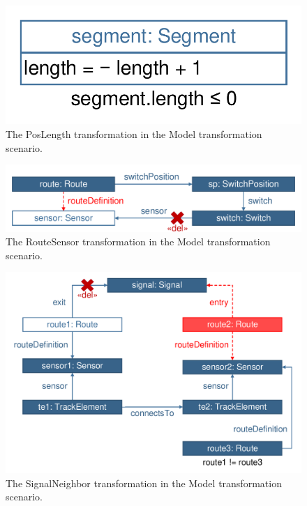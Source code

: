 \begin{figure}[htb]
	\centering
	\includegraphics[scale=0.4]{figures/trainbenchmark-transformation-xform-poslength}
	\caption{The \textsf{PosLength} transformation in the Model transformation scenario.}
	\label{fig:trainbenchmark-transformation-xform-poslength}
\end{figure}

\begin{figure}[htb]
	\centering
	\includegraphics[scale=0.4]{figures/trainbenchmark-transformation-xform-routesensor}
	\caption{The \textsf{RouteSensor} transformation in the Model transformation scenario.}
	\label{fig:trainbenchmark-transformation-xform-routesensor}
\end{figure}

\begin{figure}[htb]
	\centering
	\includegraphics[scale=0.4]{figures/trainbenchmark-transformation-xform-signalneighbor}
	\caption{The \textsf{SignalNeighbor} transformation in the Model transformation scenario.}
	\label{fig:trainbenchmark-transformation-xform-signalneighbor}
\end{figure}

